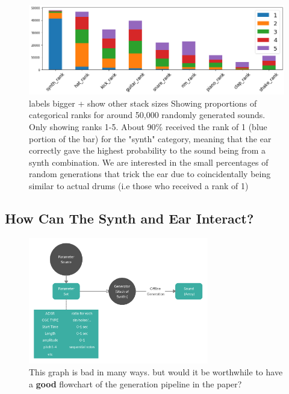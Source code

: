 \documentclass{nime-alternate} %
\begin{document}
\begin{figure}[H]
\centering
\includegraphics[width=1\linewidth]{images/random_ranks.png}
\caption{\colorbox{green!=40}{labels bigger + show other stack sizes} Showing proportions of categorical ranks for around 50,000 randomly generated sounds. Only showing ranks 1-5. About 90\% received the rank of 1 (blue portion of the bar) for the "synth" category, meaning that the ear correctly gave the highest probability to the sound being from a synth combination. We are interested in the small percentages of random generations that trick the ear due to coincidentally being similar to actual drums (i.e those who received a rank of 1) }


\label{fig:rank portions}
\end{figure}
\subsection{How Can The Synth and Ear Interact?}

\begin{figure}[htbp]
	\centering
		\includegraphics[width=0.7\textwidth]{images/SSS_gen.png}
	\caption{\colorbox{green!=40}{ This graph is bad in many ways.} but would it be worthwhile to have a \textbf{good} flowchart of 
	the generation pipeline in the paper? }
	\label{fig:BlockDiagram2}
\end{figure}
\label{fig:generation}
\end{document}
